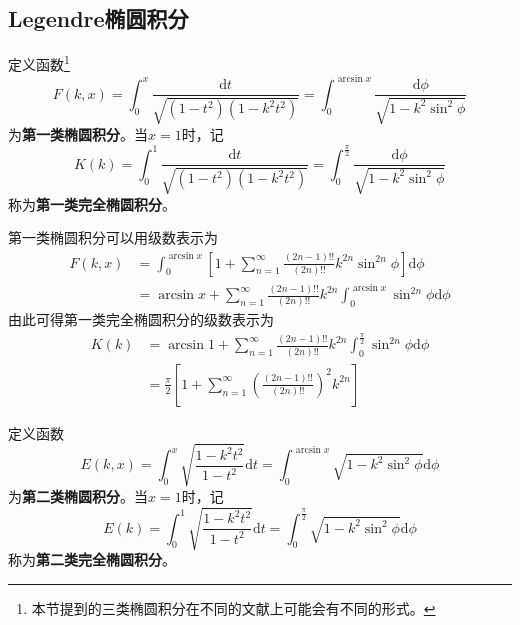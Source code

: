\subsection{Legendre椭圆积分}

定义函数\footnote{本节提到的三类椭圆积分在不同的文献上可能会有不同的形式。}
\begin{equation}
	F(k,x) = \int_0^x \frac{\mathrm{d}t}{\sqrt{(1-t^2)(1-k^2t^2)}} = \int_0^{\arcsin x} \frac{\mathrm{d}\phi}{\sqrt{1-k^2\sin^2\phi}}
	\label{第一类椭圆积分-定义}
\end{equation}
为{\bf 第一类椭圆积分}。当$x=1$时，记
\begin{equation}
	K(k) = \int_0^1 \frac{\mathrm{d}t}{\sqrt{(1-t^2)(1-k^2t^2)}} = \int_0^{\frac{\pi}{2}} \frac{\mathrm{d}\phi}{\sqrt{1-k^2\sin^2\phi}}
	\label{chp6:第一类完全椭圆积分-定义}
\end{equation}
称为{\bf 第一类完全椭圆积分}。

第一类椭圆积分可以用级数表示为
\begin{align}
	F(k,x) & = \int_0^{\arcsin x} \left[1+\sum_{n=1}^\infty \frac{(2n-1)!!}{(2n)!!}k^{2n}\sin^{2n}\phi\right]\mathrm{d}\phi \nonumber \\
	& = \arcsin x + \sum_{n=1}^\infty \frac{(2n-1)!!}{(2n)!!}k^{2n}\int_0^{\arcsin x} \sin^{2n}\phi \mathrm{d}\phi
	\label{chp6:第一类椭圆积分-级数表示}
\end{align}
由此可得第一类完全椭圆积分的级数表示为
\begin{align}
	K(k) & = \arcsin 1 + \sum_{n=1}^\infty \frac{(2n-1)!!}{(2n)!!}k^{2n}\int_0^{\frac{\pi}{2}} \sin^{2n}\phi \mathrm{d}\phi \nonumber \\
	& = \frac{\pi}{2}\left[1+\sum_{n=1}^\infty \left(\frac{(2n-1)!!}{(2n)!!}\right)^2k^{2n}\right]
	\label{chp6:第一类完全椭圆积分-级数表示}
\end{align}

定义函数
\begin{equation}
	E(k,x) = \int_0^x \sqrt{\frac{1-k^2t^2}{1-t^2}}\mathrm{d}t = \int_0^{\arcsin x} \sqrt{1-k^2\sin^2\phi}\mathrm{d}\phi
	\label{第二类椭圆积分-定义}
\end{equation}
为{\bf 第二类椭圆积分}。当$x=1$时，记
\begin{equation}
	E(k) = \int_0^1 \sqrt{\frac{1-k^2t^2}{1-t^2}}\mathrm{d}t = \int_0^{\frac{\pi}{2}} \sqrt{1-k^2\sin^2\phi}\mathrm{d}\phi
	\label{第二类完全椭圆积分-定义}
\end{equation}
称为{\bf 第二类完全椭圆积分}。

